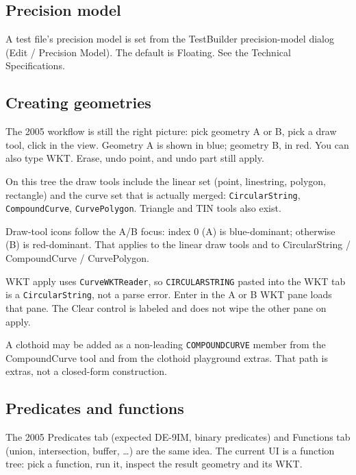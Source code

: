 \documentclass[11pt]{article}
\begin{document}
\subsection{Precision model}
A test file's precision model is set from the TestBuilder
precision-model dialog (Edit / Precision Model). The default is
Floating. See the Technical Specifications.

\subsection{Creating geometries}
The 2005 workflow is still the right picture: pick geometry A or B,
pick a draw tool, click in the view. Geometry A is shown in blue;
geometry B, in red. You can also type WKT. Erase, undo point, and
undo part still apply.

On this tree the draw tools include the linear set (point, linestring,
polygon, rectangle) and the curve set that is actually merged:
\texttt{CircularString}, \texttt{CompoundCurve},
\texttt{CurvePolygon}. Triangle and TIN tools also exist.

Draw-tool icons follow the A/B focus: index 0 (A) is blue-dominant;
otherwise (B) is red-dominant. That applies to the linear draw tools
and to CircularString / CompoundCurve / CurvePolygon.

WKT apply uses \texttt{CurveWKTReader}, so
\texttt{CIRCULARSTRING} pasted into the WKT tab is a
\texttt{CircularString}, not a parse error. Enter in the A or B WKT
pane loads that pane. The Clear control is labeled and does not wipe
the other pane on apply.


A clothoid may be added as a non-leading
\texttt{COMPOUNDCURVE} member from the CompoundCurve tool and from
the clothoid playground extras. That path is extras, not a
closed-form construction.

\subsection{Predicates and functions}
The 2005 Predicates tab (expected DE-9IM, binary predicates) and
Functions tab (union, intersection, buffer, \ldots) are the same
idea. The current UI is a function tree: pick a function, run it,
inspect the result geometry and its WKT.
\end{document}
